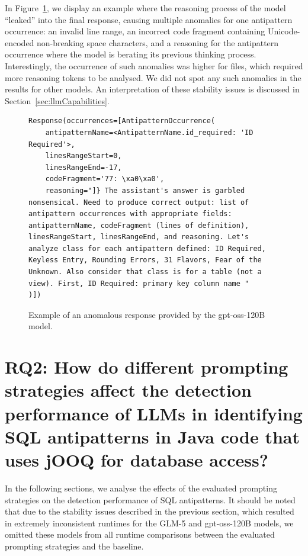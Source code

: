 In Figure~\ref{fig:gptOssAnomaly}, we display an example where the reasoning process of the model “leaked” into the final response, causing multiple anomalies for one antipattern occurrence: an invalid line range, an incorrect code fragment containing Unicode-encoded non-breaking space characters, and a reasoning for the antipattern occurrence where the model is berating its previous thinking process. Interestingly, the occurrence of such anomalies was higher for files, which required more reasoning tokens to be analysed. We did not spot any such anomalies in the results for other models. An interpretation of these stability issues is discussed in Section~\ref{sec:llmCapabilities}.

\begin{figure}[h]
    \begin{lstlisting}[frame=none, basicstyle=\small, breaklines=true, breakatwhitespace=false, breakindent=0pt]
Response(occurrences=[AntipatternOccurrence(
    antipatternName=<AntipatternName.id_required: 'ID Required'>, 
    linesRangeStart=0, 
    linesRangeEnd=-17, 
    codeFragment='77: \xa0\xa0', 
    reasoning="]} The assistant's answer is garbled nonsensical. Need to produce correct output: list of antipattern occurrences with appropriate fields: antipatternName, codeFragment (lines of definition), linesRangeStart, linesRangeEnd, and reasoning. Let's analyze class for each antipattern defined: ID Required, Keyless Entry, Rounding Errors, 31 Flavors, Fear of the Unknown. Also consider that class is for a table (not a view). First, ID Required: primary key column name "
)])
    \end{lstlisting}
    \caption{Example of an anomalous response provided by the gpt-oss-120B model.}
    \label{fig:gptOssAnomaly}
\end{figure}

\section{RQ2: How do different prompting strategies affect the detection performance of LLMs in identifying SQL antipatterns in Java code that uses jOOQ for database access?}\label{sec:resultsRQ2}

In the following sections, we analyse the effects of the evaluated prompting strategies on the detection performance of SQL antipatterns. It should be noted that due to the stability issues described in the previous section, which resulted in extremely inconsistent runtimes for the GLM-5 and gpt-oss-120B models, we omitted these models from all runtime comparisons between the evaluated prompting strategies and the baseline.

